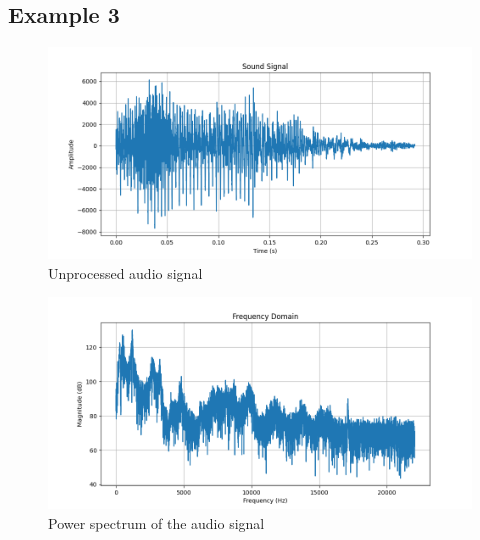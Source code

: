 \documentclass[a4paper,12pt,fleqn]{article}
\begin{document}
\subsection{Example 3}

\begin{figure}[H]
    \centering
    \includegraphics[width=1\textwidth]{ex4_raw.png}
    \caption{Unprocessed audio signal}
    \label{fig:ex4}
\end{figure}
\begin{figure}[H]
    \centering
    \includegraphics[width=1\textwidth]{ex4_frequency_domain.png}
    \caption{Power spectrum of the audio signal}
    \label{fig:ex4_freq}

\end{figure}
\end{document}
